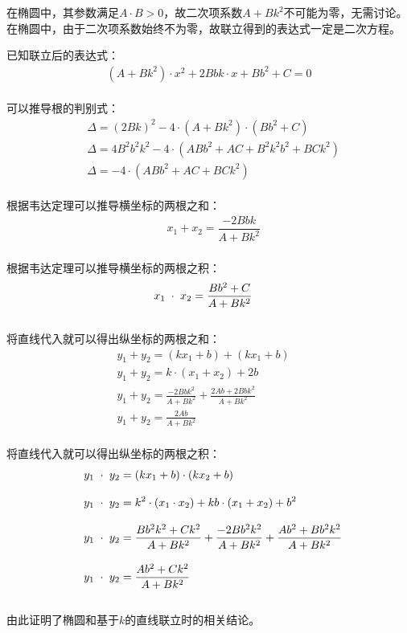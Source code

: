 \documentclass[UTF8]{ctexart}
\begin{document}
    在椭圆中，其参数满足$A\cdot B>0$，故二次项系数$A+Bk^2$不可能为零，无需讨论。\\[3mm]
    在椭圆中，由于二次项系数始终不为零，故联立得到的表达式一定是二次方程。
    
\newpage

    已知联立后的表达式：
    \begin{align}
        \left(A+Bk^2\right)\cdot x^2+2Bbk\cdot x+Bb^2+C=0
    \end{align}\\
    可以推导根的判别式：
    \begin{align}
        &\Delta=(2Bk)^2-4\cdot\left(A+Bk^2\right)\cdot\left(Bb^2+C\right)\\[3mm]
        &\Delta=4B^2b^2k^2-4\cdot\left(ABb^2+AC+B^2k^2b^2+BCk^2\right)\\[3mm]
        &\Delta=-4\cdot\left(ABb^2+AC+BCk^2\right)
    \end{align}\\
    根据韦达定理可以推导横坐标的两根之和：
    \begin{align}
        &x_1+x_2=\dfrac{-2Bbk}{A+Bk^2}
    \end{align}\\
    根据韦达定理可以推导横坐标的两根之积：
    \begin{align}
        &x_1\hspace{3.0pt}\cdot\hspace{3.0pt}x_2=\dfrac{Bb^2+C}{A+Bk^2}
    \end{align}\\    
    将直线代入就可以得出纵坐标的两根之和：\vspace{3pt}
    \begin{align}
        &y_1+y_2=(kx_1+b)+(kx_1+b)\\[3mm]
        &y_1+y_2=k\cdot(x_1+x_2)+2b\\[3mm]
        &y_1+y_2=\frac{-2Bbk^2}{A+Bk^2}+\frac{2Ab+2Bbk^2}{A+Bk^2}~~~~~~~~~~~~~~~~~~~~~~\\[3mm]
        &y_1+y_2=\frac{2Ab}{A+Bk^2}
    \end{align}\\
    将直线代入就可以得出纵坐标的两根之积：\vspace{3pt}
    \begin{align}
        &~~y_1\hspace{3.0pt}\cdot\hspace{3.0pt}y_2=(kx_1+b)\cdot(kx_2+b)\\[3mm]
        &~~y_1\hspace{3.0pt}\cdot\hspace{3.0pt}y_2=k^2\cdot(x_1\cdot x_2)+kb\cdot(x_1+x_2)+b^2\\[3mm]
        &~~y_1\hspace{3.0pt}\cdot\hspace{3.0pt}y_2=\frac{Bb^2k^2+Ck^2}{A+Bk^2}+\frac{-2Bb^2k^2}{A+Bk^2}+\frac{Ab^2+Bb^2k^2}{A+Bk^2}\\[3mm]
        &~~y_1\hspace{3.0pt}\cdot\hspace{3.0pt}y_2=\frac{Ab^2+Ck^2}{A+Bk^2}
    \end{align}\\
    由此证明了椭圆和基于$k$的直线联立时的相关结论。
\end{document}
